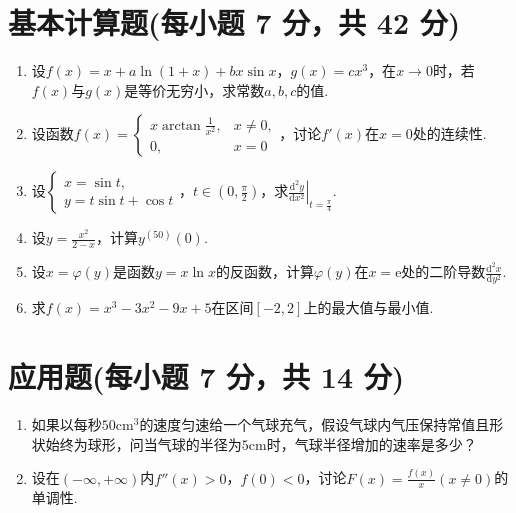 \documentclass[../Main.tex]{subfiles}
\begin{document}
  \section{基本计算题(每小题 7 分，共 42 分)}
  \begin{enumerate}
    \item[11.] 设$f(x)=x+a\ln(1+x)+bx\sin x$，$g(x)=cx^{3}$，在$x\to0$时，若$f(x)$与$g
      (x)$是等价无穷小，求常数$a,b,c$的值.
      \vspace{10em}

    \item[12.] 设函数$f(x)=
      \begin{cases}
        x\arctan\frac{1}{x^{2}}, & x\neq0, \\
        0,                       & x=0
      \end{cases}$，讨论$f'(x)$在$x=0$处的连续性.
      \vspace{10em}

    \item[13.] 设$\begin{cases}
        x=\sin t,        \\
        y=t\sin t+\cos t
      \end{cases}$，$t\in\left(0,\frac{\pi}{2}\right)$，求$\left.\frac{\mathrm{d}^{2}
      y}{\mathrm{d}x^{2}}\right|_{t=\frac{\pi}{4}}$.
      \vspace{10em}

    \item[14.] 设$y=\frac{x^{2}}{2-x}$，计算$y^{(50)}(0)$.
      \vspace{10em}

    \item[15.] 设$x=\varphi(y)$是函数$y=x\ln x$的反函数，计算$\varphi(y)$在$x=\mathrm{e}$处的二阶导数$\frac{\mathrm{d}^{2}
      x}{\mathrm{d}y^{2}}$.
      \vspace{12em}

    \item[16.] 求$f(x)=x^{3}-3x^{2}-9x+5$在区间$[-2,2]$上的最大值与最小值.
      \vspace{12em}
  \end{enumerate}

  \section{应用题(每小题 7 分，共 14 分)}
  \begin{enumerate}
    \item[17.] 如果以每秒$50\mathrm{cm}^{3}$的速度匀速给一个气球充气，假设气球内气压保持常值且形状始终为球形，问当气球的半径为$5
      \mathrm{cm}$时，气球半径增加的速率是多少？
      \vspace{15em}

    \item[18.] 设在$\left(-\infty,+\infty\right)$内$f''(x)>0$，$f(0)<0$，讨论$F(x
      )=\frac{f(x)}{x}(x\neq0)$的单调性.
      \vspace{15em}
  \end{enumerate}
\end{document}
